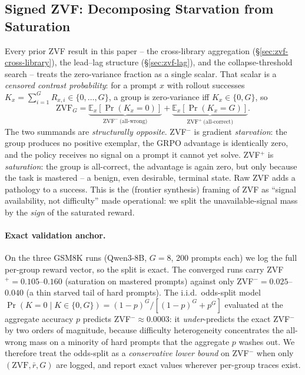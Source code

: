 \documentclass{article}
\begin{document}
\subsection{Signed ZVF: Decomposing Starvation from Saturation}
\label{sec:zvf-signed}
Every prior ZVF result in this paper -- the cross-library aggregation
(\S\ref{sec:zvf-cross-library}), the lead--lag structure
(\S\ref{sec:zvf-lag}), and the collapse-threshold search -- treats the
zero-variance fraction as a single scalar. That scalar is a
\emph{censored contrast probability}: for a prompt $x$ with rollout
successes $K_x{=}\sum_{i=1}^{G} R_{x,i} \in \{0,\dots,G\}$, a group is
zero-variance iff $K_x{\in}\{0,G\}$, so
\begin{equation}
\mathrm{ZVF}_G = \underbrace{\mathbb{E}_x\!\left[\Pr(K_x{=}0)\right]}_{\text{ZVF}^-\ \text{(all-wrong)}}
             + \underbrace{\mathbb{E}_x\!\left[\Pr(K_x{=}G)\right]}_{\text{ZVF}^+\ \text{(all-correct)}}.
\end{equation}
The two summands are \emph{structurally opposite}. ZVF$^-$ is
gradient \emph{starvation}: the group produces no positive exemplar, the
GRPO advantage is identically zero, and the policy receives no signal on
a prompt it cannot yet solve. ZVF$^+$ is \emph{saturation}: the group is
all-correct, the advantage is again zero, but only because the task is
mastered -- a benign, even desirable, terminal state. Raw ZVF adds a
pathology to a success. This is the (frontier synthesis) framing of ZVF
as ``signal availability, not difficulty'' made operational: we split
the unavailable-signal mass by the \emph{sign} of the saturated reward.

\paragraph{Exact validation anchor.}
On the three GSM8K runs (Qwen3-8B, $G{=}8$, 200 prompts each) we log the
full per-group reward vector, so the split is exact. The converged runs
carry ZVF$^+{=}0.105$--$0.160$ (saturation on mastered prompts) against
only ZVF$^-{=}0.025$--$0.040$ (a thin starved tail of hard prompts). The
i.i.d.\ odds-split model $\Pr(K{=}0\mid K{\in}\{0,G\})=(1{-}p)^G/[(1{-}p)^G{+}p^G]$
evaluated at the aggregate accuracy $p$ predicts ZVF$^-{\approx}0.0003$:
it \emph{under}-predicts the exact ZVF$^-$ by two orders of magnitude,
because difficulty heterogeneity concentrates the all-wrong mass on a
minority of hard prompts that the aggregate $p$ washes out. We therefore
treat the odds-split as a \emph{conservative lower bound} on ZVF$^-$ when
only $(\mathrm{ZVF},\bar r,G)$ are logged, and report exact values wherever
per-group traces exist.
\end{document}
